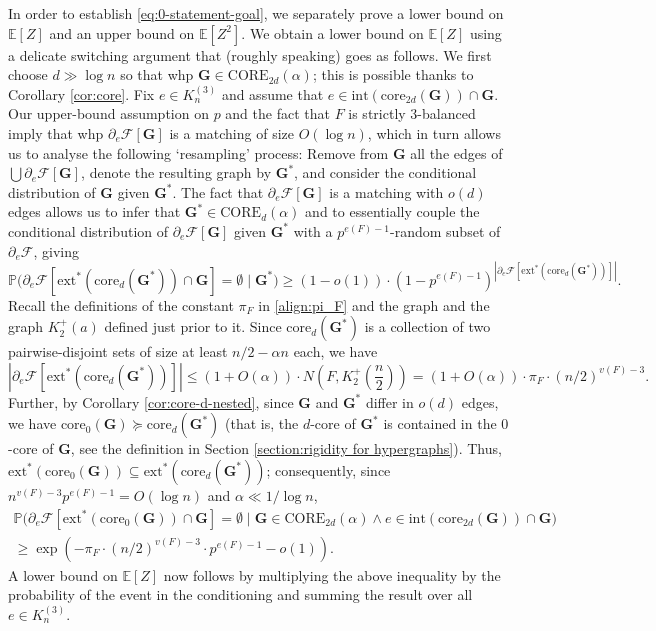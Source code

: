 \documentclass[11pt,a4paper,oneside,reqno]{amsart}
\newcommand{\bG}{\mathbf{G}}
\newcommand{\bGs}{\mathbf{G^*}}
\newcommand{\cF}{\mathcal{F}}
\renewcommand{\Pr}{\mathbb{P}}
\newcommand{\Ex}{\mathbb{E}}
\newcommand{\1}{\mathbbm{1}} %
\renewcommand{\le}{\leqslant}
\renewcommand{\ge}{\geqslant}
\newcommand{\ext}{\mathrm{ext}}
\renewcommand{\int}{\mathrm{int}}
\newcommand{\core}{\mathrm{core}}
\newcommand{\Core}{\mathrm{CORE}}
\begin{document}
In order to establish \eqref{eq:0-statement-goal}, we separately prove a lower bound on $\Ex[Z]$ and an upper bound on $\Ex[Z^2]$.  We obtain a lower bound on $\Ex[Z]$ using a delicate switching argument that (roughly speaking) goes as follows.  We first choose $d \gg \log n$ so that whp $\bG \in \Core_{2d}(\alpha)$;
this is possible thanks to Corollary \ref{cor:core}.
Fix $e \in K_n^{(3)}$ and assume that $e \in \int(\core_{2d}(\bG)) \cap \bG$.  Our upper-bound assumption on $p$ and the fact that $F$ is strictly $3$-balanced imply that whp $\partial_e\cF[\bG]$ is a matching of size $O(\log n)$, which in turn allows us to analyse the following `resampling' process:  Remove from $\bG$ all the edges of $\bigcup \partial_e \cF[\bG]$, denote the resulting graph by $\bGs$, and consider the conditional distribution of $\bG$ given $\bGs$.  The fact that $\partial_e\cF[\bG]$ is a matching with $o(d)$ edges allows us to infer that $\bGs \in \Core_{d}(\alpha)$ and to essentially couple the conditional distribution of $\partial_e\cF[\bG]$ given $\bGs$ with a $p^{e(F)-1}$-random subset of $\partial_e \cF$, giving
\[
  \Pr\big(\partial_e\cF[\ext^*(\core_d(\bGs)) \cap \bG] = \emptyset \mid \bGs\big) \ge (1-o(1)) \cdot \left(1-p^{e(F)-1}\right)^{|\partial_e\cF[\ext^*(\core_d(\bGs))]|}.
\]
Recall the definitions of the constant $\pi_F$ in \eqref{align:pi_F} and the graph and the graph $K_2^+(a)$ defined just prior to it. Since $\core_d(\bGs)$ is a collection of two pairwise-disjoint sets of size at least $n/2 - \alpha n$ each, we have
\[
  |\partial_e \cF[\ext^*(\core_d(\bGs))]| \le (1+O(\alpha)) \cdot N\left(F, K_2^+\left(\frac{n}{2}\right)\right) = (1+O(\alpha)) \cdot \pi_F \cdot (n/2)^{v(F)-3}.
\]
Further, by Corollary \ref{cor:core-d-nested}, since $\bG$ and $\bGs$ differ in $o(d)$ edges, we have $\core_0(\bG) \succeq \core_d(\bGs)$ (that is, the $d$-core of $\bGs$ is contained in the $0$-core of $\bG$, see the definition in Section \ref{section:rigidity for hypergraphs}). Thus, $\ext^*(\core_0(\bG)) \subseteq \ext^*(\core_d(\bGs))$; consequently, since $n^{v(F)-3} p^{e(F)-1} = O(\log n)$ and $\alpha \ll 1/\log n$,
\begin{multline*}
  \Pr\big(\partial_e\cF[\ext^*(\core_0(\bG)) \cap \bG] = \emptyset \mid \bG \in \Core_{2d}(\alpha) \wedge e \in \int(\core_{2d}(\bG)) \cap \bG\big) \\
  \ge \exp\left(-\pi_F \cdot (n/2)^{v(F)-3} \cdot p^{e(F)-1}-o(1)\right).
\end{multline*}
A lower bound on $\Ex[Z]$ now follows by multiplying the above inequality by the probability of the event in the conditioning and summing the result over all $e \in K_n^{(3)}$.
\end{document}
